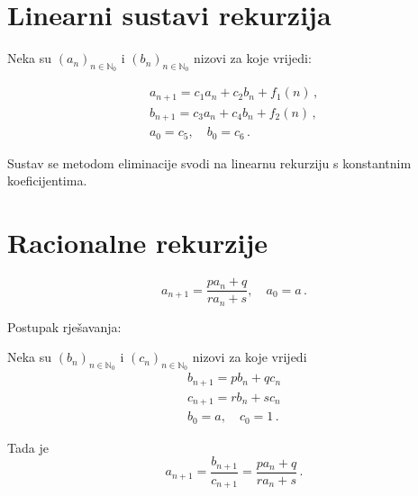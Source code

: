 \section{Linearni sustavi rekurzija}

\begin{example}
    Neka su $(a_n)_{n\in\mathbb{N}_0}$ i $(b_n)_{n\in\mathbb{N}_0}$ nizovi za koje vrijedi:

    \begin{gather*}
        a_{n+1} = c_1a_n+c_2b_n+f_1(n)\,,\\
        b_{n+1} = c_3a_n+c_4b_n+f_2(n)\,,\\
        a_0=c_5,\quad b_0=c_6\,.
    \end{gather*}
\end{example}

Sustav se metodom eliminacije svodi na linearnu rekurziju s konstantnim
koeficijentima.

\section{Racionalne rekurzije}

$$
a_{n+1} = \frac{pa_n+q}{ra_n+s},\quad a_0 = a\,.
$$

Postupak rješavanja:

Neka su $(b_n)_{n\in\mathbb{N}_0}$ i $(c_n)_{n\in\mathbb{N}_0}$ nizovi za koje vrijedi
\begin{gather*}
    b_{n+1} = pb_n + qc_n\\
    c_{n+1} = rb_n + sc_n\\
    b_0=a,\quad c_0 = 1\,.
\end{gather*}

Tada je
$$
    a_{n+1} = \frac{b_{n+1}}{c_{n+1}} = \frac{pa_n+q}{ra_n+s}\,.
$$
